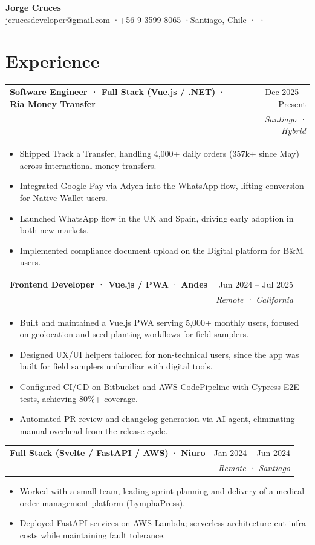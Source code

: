 \documentclass[9.5pt, a4paper]{article}
\makeatletter
\newcommand{\cvheader}[5]{%
  {\LARGE\bfseries #1}\\[0.2em]
  {\small
    \href{mailto:#2}{#2}
    \enspace\textcolor{muted}{·}\enspace #3
    \enspace\textcolor{muted}{·}\enspace #4
    \enspace\textcolor{muted}{·}\enspace \href{https://github.com/#5}{\faGithub}
    \enspace\textcolor{muted}{·}\enspace \href{https://jcrucesdeveloper.com}{\faGlobe}
  }
  \vspace{0.15em}
}
\newcommand{\experience}[4]{%
  \noindent
  \begin{tabularx}{\linewidth}{@{}X r@{}}
    \textbf{#1} \textcolor{muted}{·} \textbf{#2} & \textcolor{muted}{\small #3}\\[-0.1em]
    & \textcolor{muted}{\small\itshape #4}
  \end{tabularx}
  \vspace{0.04em}
}
\makeatother
\begin{document}
\pagestyle{empty}

\cvheader
  {Jorge Cruces}
  {jcrucesdeveloper@gmail.com}
  {+56 9 3599 8065}
  {Santiago, Chile}
  {jcrucesdeveloper}

\section{Experience}

\experience{Software Engineer · Full Stack (Vue.js / .NET)}{Ria Money Transfer}{Dec 2025 – Present}{Santiago · Hybrid}
\begin{itemize}
  \item Shipped Track a Transfer, handling 4,000+ daily orders (357k+ since May) across international money transfers.
  \item Integrated Google Pay via Adyen into the WhatsApp flow, lifting conversion for Native Wallet users.
  \item Launched WhatsApp flow in the UK and Spain, driving early adoption in both new markets.
  \item Implemented compliance document upload on the Digital platform for B\&M users.
\end{itemize}
\vspace{0.4em}

\experience{Frontend Developer · Vue.js / PWA}{Andes}{Jun 2024 – Jul 2025}{Remote · California}
\begin{itemize}
  \item Built and maintained a Vue.js PWA serving 5,000+ monthly users, focused on geolocation and seed-planting workflows for field samplers.
  \item Designed UX/UI helpers tailored for non-technical users, since the app was built for field samplers unfamiliar with digital tools.
  \item Configured CI/CD on Bitbucket and AWS CodePipeline with Cypress E2E tests, achieving 80\%+ coverage.
  \item Automated PR review and changelog generation via AI agent, eliminating manual overhead from the release cycle.
\end{itemize}
\vspace{0.4em}

\experience{Full Stack (Svelte / FastAPI / AWS)}{Niuro}{Jan 2024 – Jun 2024}{Remote · Santiago}
\begin{itemize}
  \item Worked with a small team, leading sprint planning and delivery of a medical order management platform (LymphaPress).
  \item Deployed FastAPI services on AWS Lambda; serverless architecture cut infra costs while maintaining fault tolerance.
\end{itemize}
\vspace{0.4em}
\end{document}
